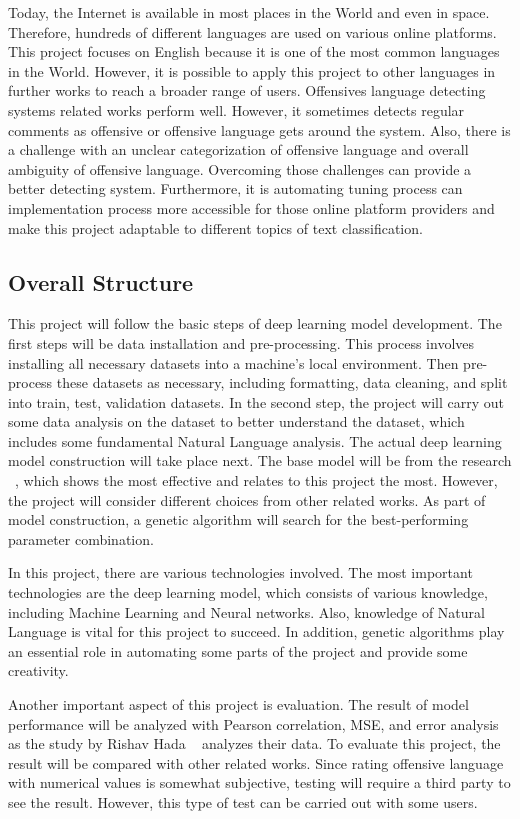 \documentclass[11pt, natbib=false]{article}
\begin{document}
Today, the Internet is available in most places in the World and even in space.
Therefore, hundreds of different languages are used on various online platforms.
This project focuses on English because it is one of the most common languages in the World.
However, it is possible to apply this project to other languages in further works to reach a broader range of users.
Offensives language detecting systems related works perform well.
However, it sometimes detects regular comments as offensive or offensive language gets around the system.
Also, there is a challenge with an unclear categorization of offensive language and overall ambiguity of offensive language.
Overcoming those challenges can provide a better detecting system.
Furthermore, it is automating tuning process can implementation process more accessible for those online platform providers and make this project adaptable to different topics of text classification. 

\subsection{Overall Structure}
This project will follow the basic steps of deep learning model development.
The first steps will be data installation and pre-processing.
This process involves installing all necessary datasets into a machine’s local environment.
Then pre-process these datasets as necessary, including formatting, data cleaning, and split into train, test, validation datasets.
In the second step, the project will carry out some data analysis on the dataset to better understand the dataset, which includes some fundamental Natural Language analysis.
The actual deep learning model construction will take place next.
The base model will be from the research ~\cite{hada2021ruddit}, which shows the most effective and relates to this project the most.
However, the project will consider different choices from other related works.
As part of model construction, a genetic algorithm will search for the best-performing parameter combination. 

In this project, there are various technologies involved.
The most important technologies are the deep learning model, which consists of various knowledge, including Machine Learning and Neural networks.
Also, knowledge of Natural Language is vital for this project to succeed.
In addition, genetic algorithms play an essential role in automating some parts of the project and provide some creativity.

Another important aspect of this project is evaluation.
The result of model performance will be analyzed with Pearson correlation, MSE, and error analysis as the study by Rishav Hada ~\cite{hada2021ruddit} analyzes their data.
To evaluate this project, the result will be compared with other related works.
Since rating offensive language with numerical values is somewhat subjective, testing will require a third party to see the result.
However, this type of test can be carried out with some users. 
\end{document}
